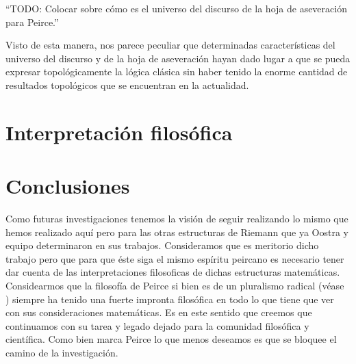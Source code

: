 \documentclass[
	fontsize=10pt, %
	twoside=false, %
	secnumdepth=1, %
	abstract=true, %
]{kaohandt}
\begin{document}
\enquote{TODO: Colocar sobre cómo es el universo del discurso de la hoja de aseveración para Peirce.}

Visto de esta manera, nos parece peculiar que determinadas características del universo del discurso y de la hoja de aseveración hayan dado lugar a que se pueda expresar topológicamente la lógica clásica sin haber tenido la enorme cantidad de resultados topológicos que se encuentran en la actualidad.


\section{Interpretación filosófica} %
\label{sec:Interpretación filosófica}


\section{Conclusiones} %
\label{sec:Conclusiones}

Como futuras investigaciones tenemos la visión de seguir realizando lo mismo que hemos realizado aquí pero para las otras estructuras de Riemann que ya Oostra y equipo determinaron en sus trabajos. Consideramos que es meritorio dicho trabajo pero que para que éste siga el mismo espíritu peircano es necesario tener dar cuenta de las interpretaciones filosoficas de dichas estructuras matemáticas. Considearmos que la filosofía de Peirce si bien es de un pluralismo radical (véase \cite{rosenthal1994}) siempre ha tenido una fuerte impronta filosófica en todo lo que tiene que ver con sus consideraciones matemáticas. Es en este sentido que creemos que continuamos con su tarea y legado dejado para la comunidad filosófica y científica. Como bien marca Peirce lo que menos deseamos es que se bloquee el camino de la investigación.


%
%



\printbibliography[title=Bibliografía] %
\end{document}

